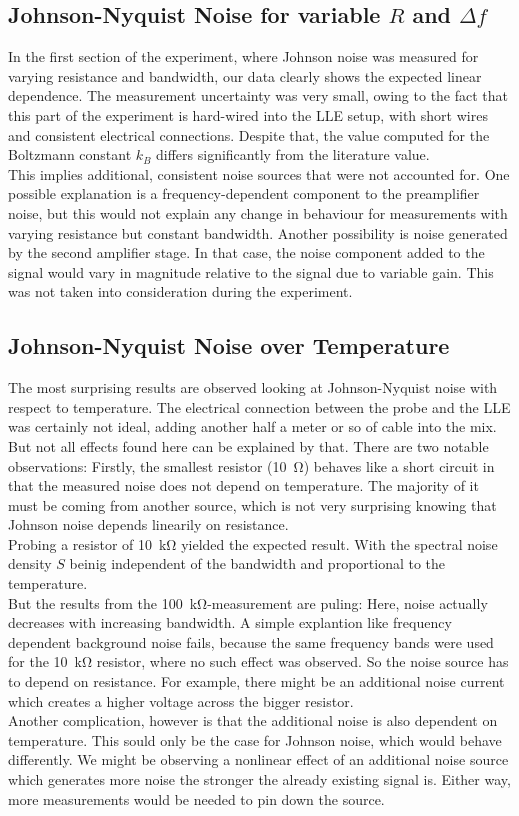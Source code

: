 \documentclass[
    parskip=half, 
    twoside=false,
    twocolumn=true,
    fontsize=11pt,
]{scrarticle}
\begin{document}
\subsection*{Johnson-Nyquist Noise for variable $R$ and $\Delta f$}
In the first section of the experiment, where Johnson noise was measured for varying resistance and bandwidth, our data clearly shows the expected linear dependence. The measurement uncertainty was very small, owing to the fact that this part of the experiment is hard-wired into the LLE setup, with short wires and consistent electrical connections. Despite that, the value computed for the Boltzmann constant $k_B$ differs significantly from the literature value. \\
This implies additional, consistent noise sources that were not accounted for. One possible explanation is a frequency-dependent component to the preamplifier noise, but this would not explain any change in behaviour for measurements with varying resistance but constant bandwidth. Another possibility is noise generated by the second amplifier stage. In that case, the noise component added to the signal would vary in magnitude relative to the signal due to variable gain. This was not taken into consideration during the experiment.

\subsection*{Johnson-Nyquist Noise over Temperature}
The most surprising results are observed looking at Johnson-Nyquist noise with respect to temperature. The electrical connection between the probe and the LLE was certainly not ideal, adding another half a meter or so of cable into the mix. But not all effects found here can be explained by that. There are two notable observations: Firstly, the smallest resistor (\SI{10}{\ohm}) behaves like a short circuit in that the measured noise does not depend on temperature. The majority of it must be coming from another source, which is not very surprising knowing that Johnson noise depends linearily on resistance.\\
Probing a resistor of \SI{10}{\kilo\ohm} yielded the expected result. 
With the spectral noise density $S$ beinig independent of the bandwidth and proportional to the temperature.\\
But the results from the \SI{100}{\kilo\ohm}-measurement are puling: Here, noise actually decreases with increasing bandwidth. A simple explantion like frequency dependent background noise fails, because the same frequency bands were used for the \SI{10}{\kilo\ohm} resistor, where no such effect was observed. 
So the noise source has to depend on resistance. For example, there might be an additional noise current which creates a higher voltage across the bigger resistor.\\
Another complication, however is that the additional noise is also dependent on temperature. This sould only be the case for Johnson noise, which would behave differently. We might be observing a nonlinear effect of an additional noise source which generates more noise the stronger the already existing signal is. Either way, more measurements would be needed to pin down the source.
\end{document}
